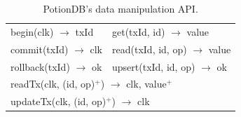 \documentclass[sigconf, nonacm]{acmart}
\newcommand{\code}[1]{\textsf{\small{#1}}}
\begin{document}
\begin{table}[t]
\center
	\begin{tabular}{ll} 
		\toprule
		 \code{begin(clk) $\rightarrow$ txId}                    & \code{get(txId, id) $\rightarrow$ value}            \\
		 \code{commit(txId) $\rightarrow$ clk}            & \code{read(txId, id, op) $\rightarrow$ value}          \\
		  \code{rollback(txId) $\rightarrow$ ok}        & \code{upsert(txId, id, op) $\rightarrow$ ok}                        \\[4pt]
		\multicolumn{2}{l}{\code{readTx(clk, (id, op)$^+$) $\rightarrow$ clk, value$^+$}} \\
		\multicolumn{2}{l}{\code{updateTx(clk, (id, op)$^+$) $\rightarrow$ clk}} \\
		\bottomrule
	\end{tabular}
	\vspace{0.8em}
	\caption{PotionDB's data manipulation API.}
	\label{table:PotionDB_API}
\end{table}
\end{document}
